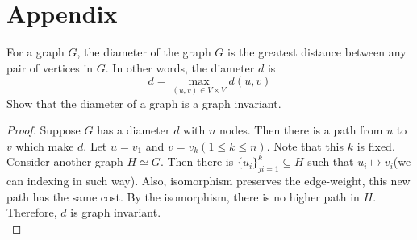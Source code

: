 \section*{Appendix}
	For a graph $G$, the diameter of the graph $G$ is the greatest distance between any pair of vertices in $G$. In other words, the diameter $d$ is
	\begin{equation*}
		d = \max\limits_{(u,v)\in V\times V}d(u, v)
	\end{equation*}
	Show that the diameter of a graph is a graph invariant.
	\begin{proof}
		Suppose $G$ has a diameter $d$ with $n$ nodes. Then there is a path from $u$ to $v$ which make $d$. Let $u = v_1$ and $v = v_k(1\leq k \leq n)$. Note that this $k$ is fixed. Consider another graph $H\simeq G$. Then there is $\{u_i\}_{ji=1}^k\subseteq H$ such that $u_i \mapsto v_i$(we can indexing in such way). Also, isomorphism preserves the edge-weight, this new path has the same cost. By the isomorphism, there is no higher path in $H$. Therefore, $d$ is graph invariant.\\
	\end{proof}